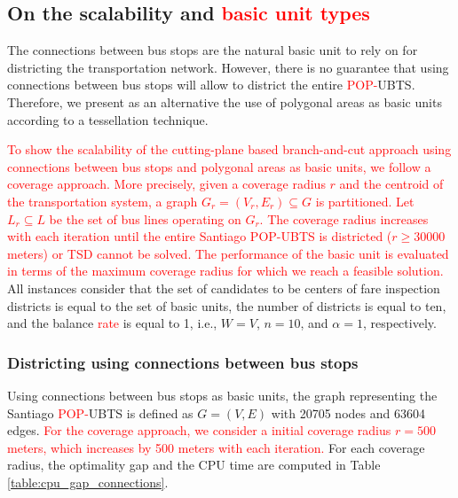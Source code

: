 \documentclass[preprint,11pt]{elsarticle}
\begin{document}
\subsection{On the scalability and \textcolor{red}{basic unit types}}
The connections between bus stops are the natural basic unit to rely on for districting the transportation network. However, there is no guarantee that using connections between bus stops will allow to district the entire \textcolor{red}{POP-}UBTS.
Therefore, we present as an alternative the use of polygonal areas as basic units according to a tessellation technique. 

\textcolor{red}{To show the scalability of the cutting-plane based branch-and-cut approach using connections between bus stops and polygonal areas as basic units, we follow a coverage approach. 
More precisely, given a coverage radius $r$ and the centroid of the transportation system, a graph $G_{r} = (V_{r}, E_{r}) \subseteq G$ is partitioned.
Let $L_{r} \subseteq L$ be the set of bus lines operating on $G_{r}$.
The coverage radius increases with each iteration until the entire Santiago POP-UBTS is districted ($r \geq 30000$ meters) or TSD cannot be solved. The performance of the basic unit is evaluated in terms of the maximum coverage radius for which we reach a feasible solution.}
All instances consider that the set of candidates to be centers of fare inspection districts is equal to the set of basic units, the number of districts is equal to ten, and the balance \textcolor{red}{rate} is equal to 1, i.e., $W=V$, $n = 10$, and $\alpha = 1$, respectively.

\subsubsection{Districting using connections between bus stops} \label{sec:connections}
Using connections between bus stops as basic units, the graph representing the Santiago \textcolor{red}{POP-}UBTS is defined as $G = (V, E)$ with 20705 nodes and 63604 edges.
\textcolor{red}{For the coverage approach, we consider a initial coverage radius $r = 500$ meters, which increases by 500 meters with each iteration.}
For each coverage radius, the optimality gap and the CPU time are computed in Table \ref{table:cpu_gap_connections}.
\end{document}
